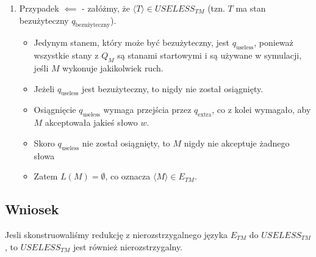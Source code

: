 \documentclass{article}
\begin{document}
\begin{enumerate}
\begin{itemize}
        Konstrukcja $T$ (poprawne powiązanie):
        Dodajemy nowy stan $q_{\mathrm{useless}}$ oraz $q_{\mathrm{trigger}}$.
        1. $T$ symuluje $M$ na $x$.
        2. Jeżeli $M$ akceptuje, $T$ przechodzi do $q_{\mathrm{trigger}}$.
        3. Ze stanu $q_{\mathrm{trigger}}$, $T$ przechodzi do wszystkich stanów $q \in Q_M$ oraz \textbf{do $q_{\mathrm{useless}}$}.
        4. Jeżeli $M$ nie akceptuje, $T$ nigdzie nie przechodzi.

        *uprawomocnienie (najprostsza forma):
        $T$ ma stan $q_{\mathrm{useless}}$, który jest osiągalny \textbf{tylko} ze stanu akceptującego $M$.

        $T$ ma stany $Q_T = Q_M \cup \{q_{\mathrm{extra}}, q_{\mathrm{useless}}\}$.
        \begin{enumerate}
            \item Reguły $M$ są zachowane.
            \item Nowy stan $q_{\mathrm{extra}}$ jest stanem, do którego przechodzi $T$ po akceptacji $M$: $\delta_T(q, x) = (q_{\mathrm{extra}}, y, d)$, jeśli $\delta_M(q, x) = (q_{\mathrm{accept}}, y, d)$.
            \item Z $q_{\mathrm{extra}}$ jest reguła prowadząca TYLKO do $q_{\mathrm{useless}}$.
            \item $q_{\mathrm{useless}}$ jest stanem akceptującym $T$.
        \end{enumerate}

        \item W tym przypadku $L(M) = \emptyset$. $M$ nigdy nie akceptuje. $T$ nigdy nie przechodzi do $q_{\mathrm{extra}}$, a co za tym idzie,$q_{\mathrm{useless}}$ jest stanem bezużytecznym. Zatem $\langle T \rangle \in USELESS_{TM}$.
    \end{itemize}

    \item Przypadek $\impliedby$ - załóżmy, że $\langle T \rangle \in USELESS_{TM}$ (tzn. $T$ ma stan bezużyteczny $q_{\mathrm{bezużyteczny}}$).
    \begin{itemize}
        \item Jedynym stanem, który może być bezużyteczny, jest $q_{\mathrm{useless}}$, ponieważ wszystkie stany z $Q_M$ są stanami startowymi i są używane w symulacji, jeśli $M$ wykonuje jakikolwiek ruch.
        \item Jeżeli $q_{\mathrm{useless}}$ jest bezużyteczny, to nigdy nie został osiągnięty.
        \item Osiągnięcie $q_{\mathrm{useless}}$ wymaga przejścia przez $q_{\mathrm{extra}}$, co z kolei wymagało, aby $M$ akceptowała jakieś słowo $w$.
        \item Skoro $q_{\mathrm{useless}}$ nie został osiągnięty, to $M$ nigdy nie akceptuje żadnego słowa
        \item Zatem $L(M) = \emptyset$, co oznacza $\langle M \rangle \in E_{TM}$.
    \end{itemize}
\end{enumerate}


\subsection*{Wniosek}

Jesli skonstruowaliśmy redukcję z nierozstrzygalnego języka $E_{TM}$ do $USELESS_{TM}$, to $USELESS_{TM}$ jest również nierozstrzygalny.
\end{document}
